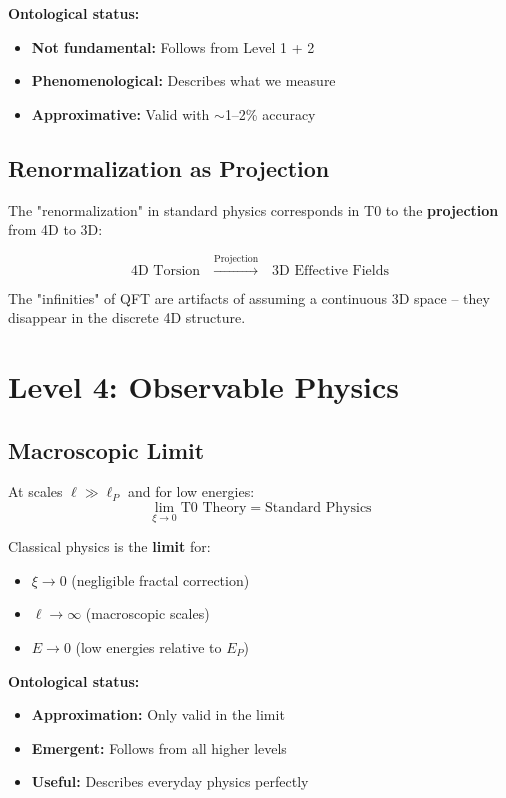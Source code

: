 	\textbf{Ontological status:}
	\begin{itemize}
		\item \textbf{Not fundamental:} Follows from Level 1 + 2
		\item \textbf{Phenomenological:} Describes what we measure
		\item \textbf{Approximative:} Valid with $\sim$1--2\% accuracy
	\end{itemize}
	
	\subsection{Renormalization as Projection}
	
	The "renormalization" in standard physics corresponds in T0 to the \textbf{projection} from 4D to 3D:
	
	\begin{equation}
		\text{4D Torsion} \quad \xrightarrow{\text{Projection}} \quad \text{3D Effective Fields}
	\end{equation}
	
	The "infinities" of QFT are artifacts of assuming a continuous 3D space -- they disappear in the discrete 4D structure.
	
	\section{Level 4: Observable Physics}
	
	\subsection{Macroscopic Limit}
	
	At scales $\ell \gg \ell_P$ and for low energies:
	\begin{equation}
		\lim_{\xi \to 0} \text{T0 Theory} = \text{Standard Physics}
	\end{equation}
	
	Classical physics is the \textbf{limit} for:
	\begin{itemize}
		\item $\xi \to 0$ (negligible fractal correction)
		\item $\ell \to \infty$ (macroscopic scales)
		\item $E \to 0$ (low energies relative to $E_P$)
	\end{itemize}
	
	\textbf{Ontological status:}
	\begin{itemize}
		\item \textbf{Approximation:} Only valid in the limit
		\item \textbf{Emergent:} Follows from all higher levels
		\item \textbf{Useful:} Describes everyday physics perfectly
	\end{itemize}
	
